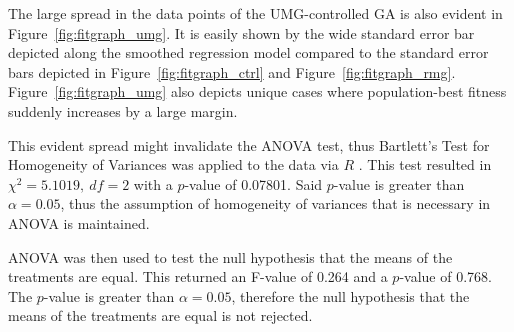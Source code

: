\documentclass{strrespaper-trad}
\begin{document}
		The large spread in the data points of the UMG-controlled GA is also evident in Figure~\ref{fig:fitgraph_umg}.
		It is easily shown by the wide standard error bar depicted along the smoothed regression model compared to the standard error bars depicted in Figure~\ref{fig:fitgraph_ctrl} and Figure~\ref{fig:fitgraph_rmg}.
		Figure~\ref{fig:fitgraph_umg} also depicts unique cases where population-best fitness suddenly increases by a large margin.

		This evident spread might invalidate the ANOVA test, thus Bartlett's Test for Homogeneity of Variances was applied to the data via $R$ \autocite{nist/sematechBartlettTest2013}.
		This test resulted in $\chi^2 = 5.1019,~df = 2$ with a $p$-value of 0.07801.
		Said $p$-value is greater than $\alpha = 0.05$, thus the assumption of homogeneity of variances that is necessary in ANOVA is maintained.

		ANOVA was then used to test the null hypothesis that the means of the treatments are equal.
		This returned an F-value of 0.264 and a $p$-value of 0.768.
		The $p$-value is greater than $\alpha = 0.05$, therefore the null hypothesis that the means of the treatments are equal is not rejected.
\end{document}
